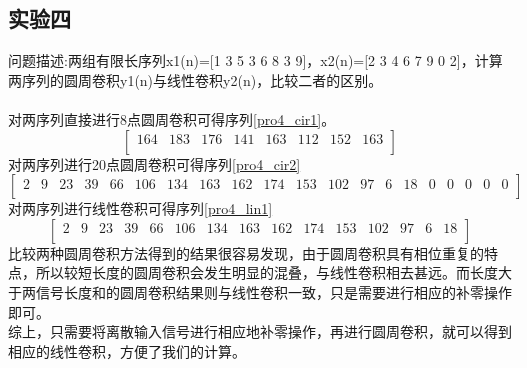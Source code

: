 \documentclass[UTF8]{article}
\begin{document}
\begin{CJK}{UTF8}{gkai}
\section{实验四}
问题描述:两组有限长序列x1(n)=[1 3 5 3 6 8 3 9]，x2(n)=[2 3 4 6 7 9 0 2]，计算两序列的圆周卷积y1(n)与线性卷积y2(n)，比较二者的区别。\\\\
对两序列直接进行8点圆周卷积可得序列\ref{pro4_cir1}。
\begin{equation}
  \left[\begin{array}{cccccccc}
    164&183&176&141&163&112&152&163\\
  \end{array}\right]
  \label{pro4_cir1}
\end{equation}
对两序列进行20点圆周卷积可得序列\ref{pro4_cir2}
\begin{equation}
  \left[
  \begin{array}{cccccccccccccccccccc}
    2&9&23&39&66&106&134&163&162&174&153&102&97&6&18&0&0&0&0&0\\
  \end{array}
  \right]
  \label{pro4_cir2}
\end{equation}
对两序列进行线性卷积可得序列\ref{pro4_lin1}
\begin{equation}
  \left[
  \begin{array}{ccccccccccccccc}
    2&9&23&39&66&106&134&163&162&174&153&102&97&6&18\\
  \end{array}
  \right]
  \label{pro4_lin1}
\end{equation}
比较两种圆周卷积方法得到的结果很容易发现，由于圆周卷积具有相位重复的特点，所以较短长度的圆周卷积会发生明显的混叠，与线性卷积相去甚远。而长度大于两信号长度和的圆周卷积结果则与线性卷积一致，只是需要进行相应的补零操作即可。\\
综上，只需要将离散输入信号进行相应地补零操作，再进行圆周卷积，就可以得到相应的线性卷积，方便了我们的计算。

\end{CJK}
\end{document}
